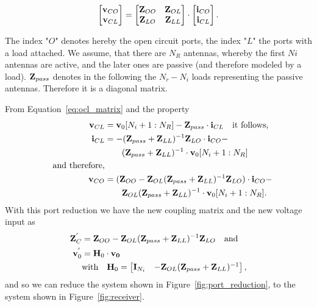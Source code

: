 \begin{align}
\label{eq:ocl_matrix}
\begin{bmatrix}
\mathbf{v}_{CO} \\
\mathbf{v}_{CL}
\end{bmatrix}
=
\begin{bmatrix}
\mathbf{Z}_{OO} & \mathbf{Z}_{OL}\\
\mathbf{Z}_{LO} & \mathbf{Z}_{LL}
\end{bmatrix}\cdot
\begin{bmatrix}
\mathbf{i}_{CO} \\
\mathbf{i}_{CL}
\end{bmatrix}.
\end{align}

The index "$O$" denotes hereby the open circuit ports, the index "$L$" the ports with a load attached.
We assume, that there are $N_R$ antennas, whereby the first $Ni$ antennas are active, and the later ones are passive (and therefore modeled by a load).
$\mathbf{Z}_{pass}$ denotes in the following the $N_r - N_i$ loads representing the passive antennas.
Therefore it is a diagonal matrix.

From Equation~\eqref{eq:ocl_matrix} and the property
\begin{align}
\mathbf{v}_{CL} &= \mathbf{v}_0[N_i+1:N_R]-\mathbf{Z}_{pass}\cdot\mathbf{i}_{CL}\quad\text{it follows,}\\
\mathbf{i}_{CL} &= -(\mathbf{Z}_{pass} + \mathbf{Z}_{LL})^{-1}\mathbf{Z}_{LO}\cdot\mathbf{i}_{CO} -\\\nonumber
&\qquad (\mathbf{Z}_{pass} + \mathbf{Z}_{LL})^{-1}\cdot\mathbf{v}_{0}[N_i+1:N_R]\\\nonumber\quad\text{and therefore,}&\\
\mathbf{v}_{CO} &= (\mathbf{Z}_{OO}-\mathbf{Z}_{OL}(\mathbf{Z}_{pass} + \mathbf{Z}_{LL})^{-1}\mathbf{Z}_{LO})\cdot\mathbf{i}_{CO} -\\\nonumber&\qquad \mathbf{Z}_{OL}(\mathbf{Z}_{pass} + \mathbf{Z}_{LL})^{-1}\cdot\mathbf{v}_0[N_i+1:N_R].
\end{align}
With this port reduction we have the new coupling matrix and the new voltage input as
\begin{align}
\mathbf{Z}_C^{'}&= \mathbf{Z}_{OO} - \mathbf{Z}_{OL}(\mathbf{Z}_{pass} + \mathbf{Z}_{LL})^{-1}\mathbf{Z}_{LO}\quad\text{and}\\
\mathbf{v}_0^{'} &= \mathbf{H}_0 \cdot \mathbf{v_0}\\\nonumber
&\text{with}\quad\mathbf{H}_0=
\begin{bmatrix}
\mathbf{I}_{N_i} & -\mathbf{Z}_{OL}(\mathbf{Z}_{pass} + \mathbf{Z}_{LL})^{-1}
\end{bmatrix},
\end{align}
and so we can reduce the system shown in Figure~\ref{fig:port_reduction}, to the system shown in Figure~\ref{fig:receiver}.

